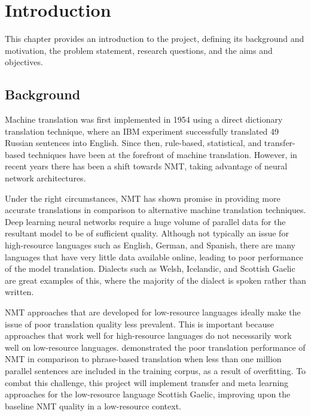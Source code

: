 \chapter{Introduction}
\label{introduction}
This chapter provides an introduction to the project, defining its background and motivation, the problem statement, research questions, and the aims and objectives.

\section{Background}
\label{Background and Motivation}
Machine translation was first implemented in 1954 using a direct dictionary translation technique, where an IBM experiment successfully translated 49 Russian sentences into English.
Since then, rule-based, statistical, and transfer-based techniques have been at the forefront of machine translation. However, in recent years there has been a shift towards \Gls{NMT}, taking advantage of neural network architectures.

Under the right circumstances, \acrshort{NMT} has shown promise in providing more accurate translations in comparison to alternative machine translation techniques. Deep learning neural networks require a huge volume of parallel data for the resultant model to be of sufficient quality. Although not typically an issue for high-resource languages such as English, German, and Spanish, there are many languages that have very little data available online, leading to poor performance of the model translation. Dialects such as Welsh, Icelandic, and Scottish Gaelic are great examples of this, where the majority of the dialect is spoken rather than written.

\acrshort{NMT} approaches that are developed for low-resource languages ideally make the issue of poor translation quality less prevalent. This is important because approaches that work well for high-resource languages do not necessarily work well on low-resource languages. \cite{koehn_six_2017} demonstrated the poor translation performance of \acrshort{NMT} in comparison to phrase-based translation when less than one million parallel sentences are included in the training corpus, as a result of overfitting. To combat this challenge, this project will implement transfer and meta learning approaches for the low-resource language Scottish Gaelic, improving upon the baseline \acrshort{NMT} quality in a low-resource context.


